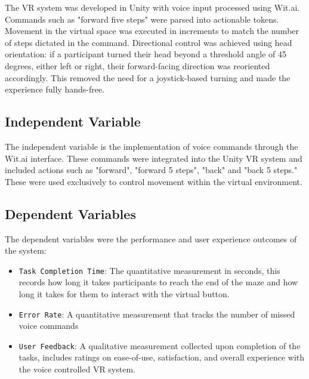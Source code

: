 \documentclass[manuscript, screen, review]{acmart}
\begin{document}
The VR system was developed in Unity with voice input processed using Wit.ai. Commands such as "forward five steps" were parsed into actionable tokens. Movement in the virtual space was executed in increments to match the number of steps dictated in the command. Directional control was achieved using head orientation: if a participant turned their head beyond a threshold angle of 45 degrees, either left or right, their forward-facing direction was reoriented accordingly. This removed the need for a joystick-based turning and made the experience fully hands-free. 



\subsection{Independent Variable}
The independent variable is the implementation of  voice commands through the Wit.ai interface. These commands were integrated into the Unity VR system and included actions such as "forward", "forward 5 steps", "back" and  "back 5 steps." These were used exclusively to control movement within the virtual environment.

\subsection{Dependent Variables}
The dependent variables were the performance and user experience outcomes of the system:
\begin{itemize}
\item {\texttt{Task Completion Time}}: The quantitative measurement in seconds, this records how long it takes participants to reach the end of the maze and how long it takes for them to interact with the virtual button. 
\item {\texttt{Error Rate}}: A quantitative measurement that tracks the number of missed voice commands
\item {\texttt{User Feedback}}: A qualitative measurement collected upon completion of the tasks, includes ratings on ease-of-use, satisfaction, and overall experience with the voice controlled VR system.  
\end{itemize}
\end{document}

